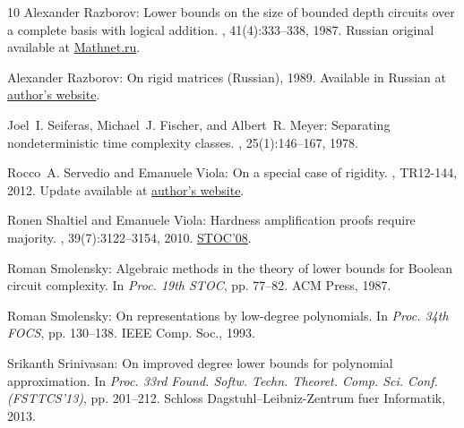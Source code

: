 \documentclass[11pt]{article}
\begin{document}
\begin{thebibliography}{10}
{\sc Alexander Razborov}: Lower bounds on the size of bounded depth circuits
  over a complete basis with logical addition.
,
  41(4):333--338, 1987.
\newblock Russian original available at
  \href{https://www.mathnet.ru/php/archive.phtml?wshow=paper&jrnid=mzm&paperid=4883}{Mathnet.ru}.
\newblock [\epfmtdoi{10.1007/BF01137685}]

{\sc Alexander Razborov}: On rigid matrices ({R}ussian), 1989.
\newblock Available in Russian at
  \href{https://people.cs.uchicago.edu/~razborov/files/rigid.pdf}{author's
  website}.

{\sc Joel~I. Seiferas, Michael~J. Fischer, and Albert~R. Meyer}: Separating
  nondeterministic time complexity classes.
, 25(1):146--167, 1978.
\newblock [\epfmtdoi{10.1145/322047.322061}]

{\sc Rocco~A. Servedio and Emanuele Viola}: On a special case of rigidity.
, TR12-144, 2012.
\newblock Update available at
  \href{http://www.ccs.neu.edu/home/viola/}{author's website}.

{\sc Ronen Shaltiel and Emanuele Viola}: Hardness amplification proofs require
  majority.
, 39(7):3122--3154, 2010.
\newblock \prelim \href{https://doi.org/10.1145/1374376.1374461}{STOC'08}.
\newblock [\epfmtdoi{10.1137/080735096}]

{\sc Roman Smolensky}: Algebraic methods in the theory of lower bounds for
  {B}oolean circuit complexity.
\newblock In {\em Proc. 19th STOC}, pp. 77--82. ACM Press, 1987.
\newblock [\epfmtdoi{10.1145/28395.28404}]

{\sc Roman Smolensky}: On representations by low-degree polynomials.
\newblock In {\em Proc. 34th FOCS}, pp. 130--138. IEEE Comp. Soc., 1993.

{\sc Srikanth Srinivasan}: On improved degree lower bounds for polynomial
  approximation.
\newblock In {\em Proc. 33rd Found. Softw. Techn. Theoret. Comp. Sci. Conf.
  (FSTTCS'13)}, pp. 201--212. Schloss Dagstuhl--Leibniz-Zentrum fuer
  Informatik, 2013.


\end{thebibliography}
\end{document}
